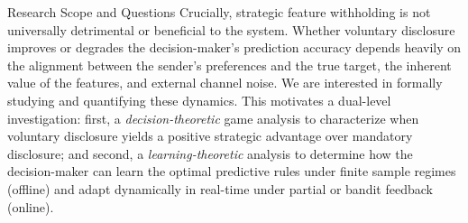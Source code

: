 \begin{faqblock}
\faqanswers
{}
\end{faqblock}

\begin{sourceblock}{Research Scope and Questions}
Crucially, strategic feature withholding is not universally detrimental or beneficial to the system. Whether voluntary disclosure improves or degrades the decision-maker's prediction accuracy depends heavily on the alignment between the sender's preferences and the true target, the inherent value of the features, and external channel noise. We are interested in formally studying and quantifying these dynamics. This motivates a dual-level investigation: first, a \textit{decision-theoretic} game analysis to characterize when voluntary disclosure yields a positive strategic advantage over mandatory disclosure; and second, a \textit{learning-theoretic} analysis to determine how the decision-maker can learn the optimal predictive rules under finite sample regimes (offline) and adapt dynamically in real-time under partial or bandit feedback (online).
\end{sourceblock}

\begin{faqblock}
\faqanswers
{}
\end{faqblock}

